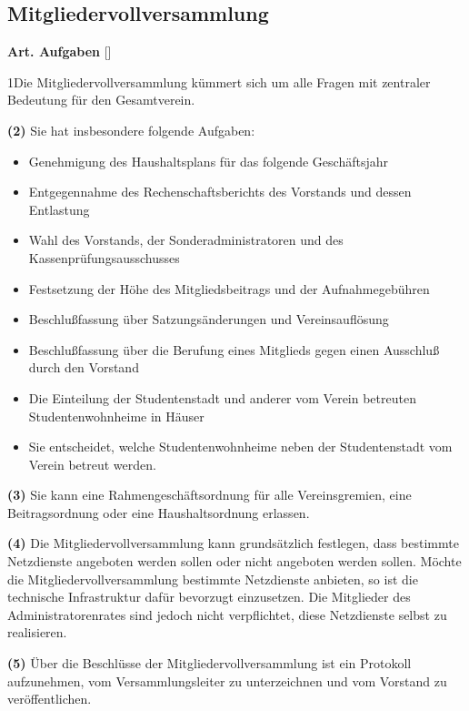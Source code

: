 \documentclass[12pt]{article}
\newcommand{\UAbschnitt}[1]{\subsection{#1}}
\newcommand{\Satz}[2]{

\begin{samepage}
{\bf (#1)} #2
\end{samepage}
}
\newenvironment{Artikel}[2]{
\bigskip \centerline{{\bf Art. #1} [#2]}
\nopagebreak
}{
}
\begin{document}
\UAbschnitt{Mitgliedervollversammlung}

\begin{Artikel}{15}{Aufgaben}

\Satz{1}{Die Mitgliedervollversammlung kümmert sich um alle Fragen mit zentraler Bedeutung für den Gesamtverein.}

\Satz{2}{Sie hat insbesondere folgende Aufgaben:
\begin{itemize}
\item Genehmigung des Haushaltsplans für das folgende Geschäftsjahr
\item Entgegennahme des Rechenschaftsberichts des Vorstands und dessen Entlastung
\item Wahl des Vorstands, der Sonderadministratoren und des Kassenprüfungsausschusses
\item Festsetzung der Höhe des Mitgliedsbeitrags und der Aufnahmegebühren
\item Beschlußfassung über Satzungsänderungen und Vereinsauflösung
\item Beschlußfassung über die Berufung eines Mitglieds gegen einen Ausschluß durch den Vorstand
\item Die Einteilung der Studentenstadt und anderer vom Verein betreuten Studentenwohnheime in Häuser
\item Sie entscheidet, welche Studentenwohnheime neben der Studentenstadt vom Verein betreut werden.
\end{itemize}}

\Satz{3}{Sie kann eine Rahmengeschäftsordnung für alle Vereinsgremien, eine Beitragsordnung oder eine Haushaltsordnung erlassen.}

\Satz{4}{Die Mitgliedervollversammlung kann grundsätzlich festlegen, dass bestimmte Netzdienste angeboten werden sollen oder nicht angeboten werden sollen.
  Möchte die Mitgliedervollversammlung bestimmte Netzdienste anbieten, so ist die technische Infrastruktur dafür bevorzugt einzusetzen.
  Die Mitglieder des Administratorenrates sind jedoch nicht verpflichtet, diese Netzdienste selbst zu realisieren.}

\Satz{5}{Über die Beschlüsse der Mitgliedervollversammlung ist ein Protokoll aufzunehmen, vom Versammlungsleiter zu unterzeichnen und vom Vorstand zu ver\-öffent\-lichen.}

\end{Artikel}
\end{document}
